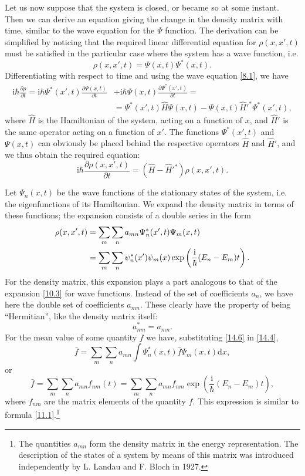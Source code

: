 Let us now suppose that the system is closed, or became so at some instant. Then we can derive an equation giving the change in the density matrix with time, similar to the wave equation for the $\Psi$ function. The derivation can be simplified by noticing that the required linear differential equation for $ \rho(x, x',t) $ must be satisfied in the particular case where the system has a wave function, i.e.
\[ \rho(x, x',t)=\Psi(x,t)\Psi^*(x,t). \]
Differentiating with respect to time and using the wave equation \eqref{8.1}, we have
\begin{align*}
\mathrm{i}\hbar\frac{\partial\rho}{\partial t}=\mathrm{i}\hbar\Psi^*(x',t)\frac{\partial\Psi(x,t)}{\partial t}&+\mathrm{i}\hbar\Psi(x,t)\frac{\partial\Psi^*(x',t)}{\partial t}=\\
&=\Psi^*(x',t)\hat{H}\Psi(x,t)-\Psi(x,t)\hat{H}'^*\Psi^*(x',t),
\end{align*}
where $ \hat{H} $ is the Hamiltonian of the system, acting on a function of $ x $, and $ \hat{H}' $ is the same operator acting on a function of $ x' $. The functions $ \Psi^*(x', t) $ and $ \Psi(x, t) $ can obviously be placed behind the respective operators $ \hat{H} $ and $ \hat{H}' $, and we thus obtain the required equation:
\begin{equation}\label{14.5}
\mathrm{i}\hbar\frac{\partial\rho(x,x',t)}{\partial t}=(\hat{H}-\hat{H}'^*)\rho(x,x',t).
\end{equation}


Let $ \Psi_n(x, t) $ be the wave functions of the stationary states of the system, i.e. the eigenfunctions of its Hamiltonian. We expand the density matrix in terms of these functions; the expansion consists of a double series in the form
\begin{align}
\rho(x,x',t)&=\sum_{m}\sum_{n}a_{mn}\Psi_n^*(x',t)\Psi_m(x,t)\notag\\
&=\sum_{m}\sum_{n}\psi_n^*(x')\psi_m(x)\exp\left(\frac{\mathrm{i}}{\hbar}(E_n-E_m)t \right).\label{14.6}
\end{align}
For the density matrix, this expansion plays a part analogous to that of the expansion \eqref{10.3} for wave functions. Instead of the set of coefficients $ a_n $, we have here the double set of coefficients $ a_{mn} $. These clearly have the property of being “Hermitian”, like the density matrix itself:
\begin{equation}\label{14.7}
a_{nm}^*=a_{mn}.
\end{equation}
For the mean value of some quantity $ f $ we have, substituting \eqref{14.6} in \eqref{14.4},
\[ \bar{f}=\sum_m\sum_na_{mn}\int\Psi_n^*(x,t)\hat{f}\Psi_m(x,t)\mathrm{d}x, \]
or
\begin{equation}\label{14.8}
\bar{f}=\sum_m\sum_na_{mn}f_{nm}(t)=\sum_m\sum_na_{mn}f_{nm}\exp\left(\frac{\mathrm{i}}{\hbar}(E_n-E_m)t \right),
\end{equation}
where $ f_{nm} $ are the matrix elements of the quantity $ f $. This expression is similar to formula \eqref{11.1}.\footnote{The quantities $ a_{mn} $ form the density matrix in the energy representation. The description of the states of a system by means of this matrix was introduced independently by L. Landau and F. Bloch in 1927.
}

